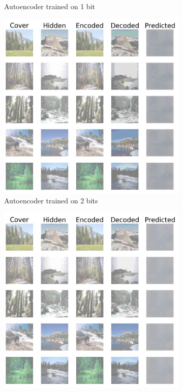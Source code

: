 \documentclass[conference]{IEEEtran}
\begin{document}
\begin{figure}[!hbt]
\begin{subfigure}[b]{0.28\textwidth}
            \caption{Autoencoder trained on 1 bit}
            \label{autoencoder_1}
    \end{subfigure}
    \hspace{0.05\textwidth}
    \begin{subfigure}[b]{0.28\textwidth}
    \centering
            \includegraphics[scale=0.13,clip=false]{images/sten_2.jpg}
            \caption{Autoencoder trained on 2 bits}
            \label{autoencoder_2}
    \end{subfigure}
    \hspace{0.05\textwidth}
    \begin{subfigure}[b]{0.28\textwidth}
    \centering
            \includegraphics[scale=0.13,clip=false]{images/sten_3.jpg}

\end{subfigure}
\end{figure}
\end{document}
